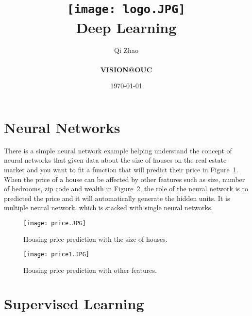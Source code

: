 \documentclass[a4paper]{article}
\title{
    \vspace*{1in}
    \texttt{[image: logo.JPG]} \\
    \vspace*{1.2in}
    \textbf{\huge Deep Learning}
    \vspace{0.2in}
}
\author{Qi Zhao  \\
    \vspace*{0.5in} \\
    \textbf{VISION@OUC} \\
    \vspace*{1in}
}
\date{\today}
\begin{document}
\maketitle
\newpage


\section{Neural Networks}
 There is a simple neural network example helping understand the concept of neural networks that given data about the size of houses on the real estate market and you want to fit a function that will predict their price in Figure~\ref{fig:onecol}. When the price of a house can be affected by other features such as size, number of bedrooms, zip code and wealth in Figure~\ref{fig:short}, the role of the neural network is to predicted the price and it will automatically generate the hidden units. It is multiple neural network, which is stacked with single neural networks.
\begin{figure}[hb]
    \centering
    \texttt{[image: price.JPG]}
    \caption{Housing price prediction with the size of houses.}
    \label{fig:onecol}
\end{figure}
\begin{figure}[hb]
    \centering
    \texttt{[image: price1.JPG]}
    \caption{Housing price prediction with other features.}
    \label{fig:short}
\end{figure}
\section{Supervised Learning}
\end{document}
